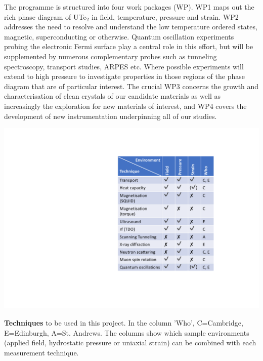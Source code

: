The programme is structured into four work packages (WP). WP1 maps out the rich phase diagram of UTe$_2$ in field, temperature, pressure and strain. WP2 addresses the need to resolve and understand the low temperature ordered states, magnetic, superconducting or otherwise. Quantum oscillation experiments probing the electronic Fermi surface play a central role in this effort, but will be supplemented by numerous complementary probes such as tunneling spectroscopy, transport studies, ARPES etc. Where possible experiments will extend to high pressure to investigate properties in those regions of the phase diagram that are of particular interest. The crucial WP3 concerns the growth and characterisation of clean crystals of our candidate materials as well as increasingly the exploration for new materials of interest, and WP4 covers the development of new instrumentation underpinning all of our studies. 


\begin{table}
  \centerline{\includegraphics[width=0.7\columnwidth]{Figures/MethodsTable.pdf}}
  \caption{{\bf Techniques} to be used in this project. In the column 'Who', C=Cambridge, E=Edinburgh, A=St. Andrews. The columns show which sample environments (applied field, hydrostatic pressure or uniaxial strain) can be combined with each measurement technique. }
  \label{tab:Methods}
\end{table}

